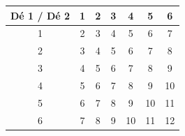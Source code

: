 \begin{center}\renewcommand{\arraystretch}{1.35}\begin{tabular}{c|cccccc}\toprule
Dé 1 / Dé 2 & 1 & 2 & 3 & 4 & 5 & 6\\\midrule
1 & \geoSolution{\color{otGreenDark}}2 & \geoSolution{\color{otGreenDark}}3 & \geoSolution{\color{otGreenDark}}4 & \geoSolution{\color{otGreenDark}}5 & \geoSolution{\color{otGreenDark}}6 & \geoSolution{\color{otGreenDark}}7\\
2 & \geoSolution{\color{otGreenDark}}3 & \geoSolution{\color{otGreenDark}}4 & \geoSolution{\color{otGreenDark}}5 & \geoSolution{\color{otGreenDark}}6 & \geoSolution{\color{otGreenDark}}7 & \geoSolution{\color{otGreenDark}}8\\
3 & \geoSolution{\color{otGreenDark}}4 & \geoSolution{\color{otGreenDark}}5 & \geoSolution{\color{otGreenDark}}6 & \geoSolution{\color{otGreenDark}}7 & \geoSolution{\color{otGreenDark}}8 & \geoSolution{\color{otGreenDark}}9\\
4 & \geoSolution{\color{otGreenDark}}5 & \geoSolution{\color{otGreenDark}}6 & \geoSolution{\color{otGreenDark}}7 & \geoSolution{\color{otGreenDark}}8 & \geoSolution{\color{otGreenDark}}9 & \geoSolution{\color{otGreenDark}}10\\
5 & \geoSolution{\color{otGreenDark}}6 & \geoSolution{\color{otGreenDark}}7 & \geoSolution{\color{otGreenDark}}8 & \geoSolution{\color{otGreenDark}}9 & \geoSolution{\color{otGreenDark}}10 & \geoSolution{\color{otGreenDark}}11\\
6 & \geoSolution{\color{otGreenDark}}7 & \geoSolution{\color{otGreenDark}}8 & \geoSolution{\color{otGreenDark}}9 & \geoSolution{\color{otGreenDark}}10 & \geoSolution{\color{otGreenDark}}11 & \geoSolution{\color{otGreenDark}}12\\
\bottomrule\end{tabular}\end{center}
\par{}
